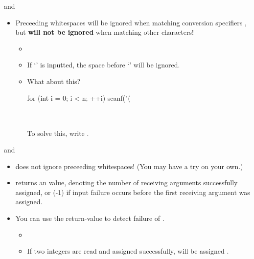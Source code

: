 \documentclass[handout]{beamer}
\begin{document}
\begin{frame}[fragile]{ and }
    \begin{itemize}
        \item Preceeding whitespaces will be ignored when matching conversion specifiers , but \textbf{will not be ignored} when matching other characters!
        \begin{itemize}
            \item {}
            \item If `' is inputted, the space before `' will be ignored.
            \pause
            \item What about this?
            \begin{cpp}
for (int i = 0; i < n; ++i)
    scanf("(%
            \end{cpp}
            \pause
            \\
            \\
            \pause
            To solve this, write .
        \end{itemize}
    \end{itemize}
\end{frame}

\begin{frame}{ and }
    \begin{itemize}
        \item {} does not ignore preceeding whitespaces! (You may have a try on your own.)
        \pause
        \item {} returns an  value, denoting the number of receiving arguments successfully assigned, or  (-1) if input failure occurs before the first receiving argument was assigned.
        \item You can use the return-value to detect failure of .
        \begin{itemize}
            \item {}
            \item If two integers are read and assigned successfully,  will be assigned .
        \end{itemize}
    \end{itemize}
\end{frame}
\end{document}
